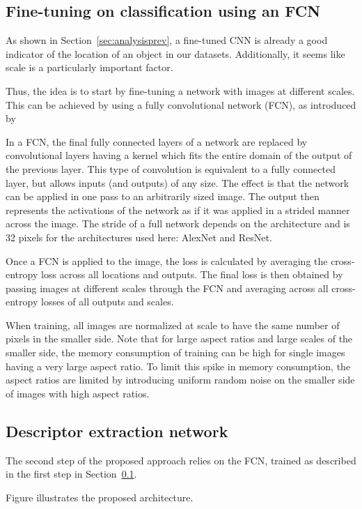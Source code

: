 \subsection{Fine-tuning on classification using an FCN}\label{sec:fcnfinetune}
As shown in Section~\ref{sec:analysisprev}, a fine-tuned CNN is already
a good indicator of the location of an object in our datasets.
Additionally, it seems like scale is a particularly important factor.

Thus, the idea is to start by fine-tuning a network with images
at different scales. This can be achieved by using a fully
convolutional network (FCN), as introduced by %

In a FCN, the final fully connected layers
of a network are replaced by convolutional layers having a kernel
which fits the entire domain of the output of the previous layer.
This type of convolution is equivalent to a fully connected layer,
but allows inputs (and outputs) of any size.
The effect is that the network can be applied in one pass to an
arbitrarily sized image. The output then represents the activations
of the network as if it was applied in a strided manner across the image.
The stride of a full network depends on the architecture and is 32
pixels for the architectures used here: AlexNet and ResNet.

Once a FCN is applied to the image, the loss
is calculated by averaging the cross-entropy loss across all locations
and outputs.
The final loss is then obtained by passing images at different scales
through the FCN and averaging across all cross-entropy losses of all
outputs and scales.

When training, all images are normalized at scale to have the same
number of pixels in the smaller side. Note that for large aspect
ratios and large scales of the smaller side,
the memory consumption of training can be high for single images
having a very large aspect ratio. To limit this spike in memory
consumption, the aspect ratios are limited by introducing uniform
random noise on the smaller side of images with high aspect ratios.

\subsection{Descriptor extraction network}
The second step of the proposed approach relies on the FCN, trained
as described in the first step in Section~\ref{sec:fcnfinetune}.

Figure %
illustrates the proposed architecture.

